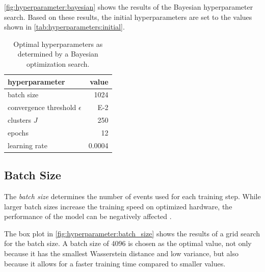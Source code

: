 \autoref{fig:hyperparameter:bayesian} shows the results of the Bayesian hyperparameter search.
Based on these results,
the initial hyperparameters are set to the values shown in \autoref{tab:hyperparameters:initial}.

\begin{table}
  \centering
  \begin{tabular}{l r}
    \toprule
    hyperparameter & {value} \\
    \midrule
    batch size & \num{1024} \\
    convergence threshold $\epsilon$ & \num{E-2} \\
    clusters $J$ & \num{250} \\
    epochs & \num{12} \\
    learning rate & \num{0.0004} \\
    \bottomrule
  \end{tabular}
  \caption{
    Optimal hyperparameters as determined by a Bayesian optimization search.
  }
  \label{tab:hyperparameters:initial}
\end{table}


\FloatBarrier
\clearpage %
\subsection{Batch Size}
The \emph{batch size} determines the number of events used for each training step.
While larger batch sizes increase the training speed
on optimized hardware,
the performance of the model can be negatively affected \cite{batchsize_kandel}.

The box plot in \autoref{fig:hyperparameter:batch_size} shows the results of a grid search for the batch size.
A batch size of \num{4096} is chosen as the optimal value,
  not only because it has
    the smallest Wasserstein distance
    and low variance,
  but also because it allows for a faster training time
    compared to smaller values.

